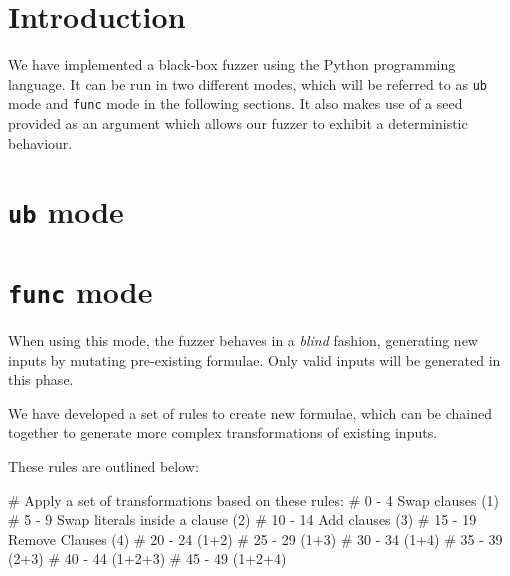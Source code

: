 


  
\section{Introduction}  
We have implemented a black-box fuzzer using the Python programming language. It can be run in two different modes, which will be referred to as \texttt{ub} mode and \texttt{func} mode in the following sections. It also makes use of a seed provided as an argument which allows our fuzzer to exhibit a deterministic behaviour.

\section{\texttt{ub} mode}

\section{\texttt{func} mode}
When using this mode, the fuzzer behaves in a \textit{blind} fashion, generating new inputs by mutating pre-existing formulae. Only valid inputs will be generated in this phase.

We have developed a set of rules to create new formulae, which can be chained together to generate more complex transformations of existing inputs.

These rules are outlined below:

    # Apply a set of transformations based on these rules:
    # 0 - 4 Swap clauses (1)
    # 5 - 9 Swap literals inside a clause (2)
    # 10 - 14 Add clauses (3)
    # 15 - 19 Remove Clauses (4)
    # 20 - 24 (1+2)
    # 25 - 29 (1+3)
    # 30 - 34 (1+4)
    # 35 - 39 (2+3)
    # 40 - 44 (1+2+3)
    # 45 - 49 (1+2+4)

